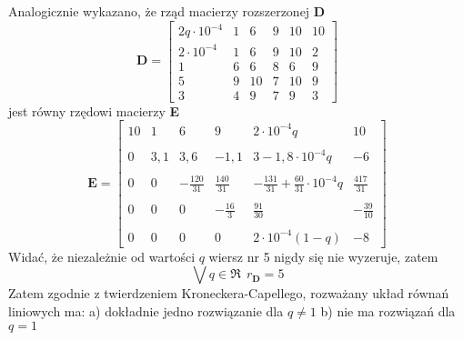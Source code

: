 \documentclass[a4paper]{article}
\begin{document}
\newline
Analogicznie wykazano, że rząd macierzy rozszerzonej \textbf{D}
\newline
$$
\mathbf{D} =
\left[
\begin{array}{cccccc}
2q\cdot 10^{-4}&1&6&9&10&10\\
2\cdot 10^{-4}&1&6&9&10&2\\
1&6&6&8&6&9\\
5&9&10&7&10&9\\
3&4&9&7&9&3
\end{array}
\right]
$$
\newline
jest równy rzędowi macierzy \textbf{E}
\newline
$$
\mathbf{E} =
\left[
\begin{array}{cccccc}
10&1&6&9&2\cdot 10^{-4}q&10\\ \\
0&3,1&3,6&-1,1&3-1,8\cdot 10^{-4}q&-6\\ \\
0&0&-\frac{120}{31}&\frac{140}{31}&-\frac{131}{31}+\frac{60}{31}\cdot 10^{-4}q&\frac{417}{31}\\ \\
0&0&0&-\frac{16}{3}&\frac{91}{30}&-\frac{39}{10}\\ \\
0&0&0&0&2\cdot 10^{-4}(1-q)&-8
\end{array}
\right]
$$
Widać, że niezależnie od wartości $q$ wiersz nr 5 nigdy się nie wyzeruje, zatem
$$
\bigvee q \in \Re~~r_{\mathbf{D}}=5
$$
\newline
Zatem zgodnie z twierdzeniem Kroneckera-Capellego, rozważany układ równań liniowych ma:
\newline
a) dokładnie jedno rozwiązanie  dla $q\neq 1$
\newline
b) nie ma rozwiązań dla $q=1$
\end{document}
